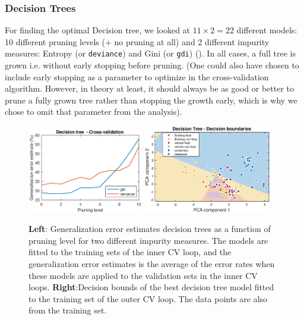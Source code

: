
\subsubsection{Decision Trees}
For finding the optimal Decision tree, we looked at $11 \times 2 = 22$ different models: 10 different pruning levels (+ no pruning at all) and 2 different impurity measures: Entropy (or \texttt{deviance}) and Gini (or \texttt{gdi}) (\cite[eq. 8.2-8.3]{coursenotes}). In all cases, a full tree is grown i.e. without early stopping before pruning. (One could also have chosen to include early stopping as a parameter to optimize in the cross-validation algorithm. However, in theory at least, it should always be as good or better to prune a fully grown tree rather than stopping the growth early, which is why we chose to omit that parameter from the analysis).  

\begin{figure}[H]
    \centering
    \includegraphics[width = 0.45\textwidth]{fig/dt-crossval.eps}
    \includegraphics[width=0.5\textwidth]{fig/dt-decision-bounds.eps}
    \caption{\textbf{Left}: Generalization error estimates decision trees as a function of pruning level for two different impurity measures. The models are fitted to the training sets of the inner CV loop, and the generalization error estimates is the average of the error rates when these models are applied to the validation sets in the inner CV loops. \textbf{Right}:Decision bounds of the best decision tree model fitted to the training set of the outer CV loop. The data points are also from the training set.}
    \label{dt-plots}
\end{figure}


